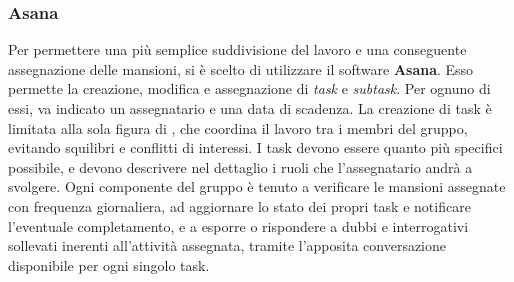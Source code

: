		\subsubsection{Asana}
		Per permettere una più semplice suddivisione del lavoro e una conseguente assegnazione delle mansioni, si è scelto di utilizzare il software \textbf{Asana}. Esso permette la creazione, modifica e assegnazione di \textit{task} e \textit{subtask}. Per ognuno di essi, va indicato un assegnatario e una data di scadenza. La creazione di task è limitata alla sola figura di \textit{\RdP}, che coordina il lavoro tra i membri del gruppo, evitando squilibri e conflitti di interessi. I task devono essere quanto più specifici possibile, e devono descrivere nel dettaglio i ruoli che l'assegnatario andrà a svolgere. Ogni componente del gruppo è tenuto a verificare le mansioni assegnate con frequenza giornaliera, ad aggiornare lo stato dei propri task e notificare l'eventuale completamento, e a esporre o rispondere a dubbi e interrogativi sollevati inerenti all'attività assegnata, tramite l'apposita conversazione disponibile per ogni singolo task.
		
		